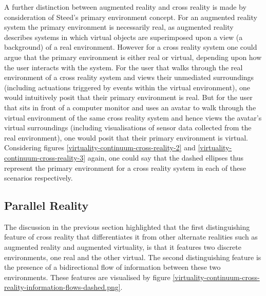 A further distinction between augmented reality and cross reality is made by consideration of Steed's primary environment concept. For an augmented reality system the primary environment is necessarily real, as augmented reality describes systems in which virtual objects are superimposed upon a view (a background) of a real environment. However for a cross reality system one could argue that the primary environment is either real or virtual, depending upon how the user interacts with the system. For the user that walks through the real environment of a cross reality system and views their unmediated surroundings (including actuations triggered by events within the virtual environment), one would intuitively posit that their primary environment is real. But for the user that sits in front of a computer monitor and uses an avatar to walk through the virtual environment of the same cross reality system and hence views the avatar's virtual surroundings (including visualisations of sensor data collected from the real environment), one would posit that their primary environment is virtual. Considering figures \ref{virtuality-continuum-cross-reality-2} and \ref{virtuality-continuum-cross-reality-3} again, one could say that the dashed ellipses thus represent the primary environment for a cross reality system in each of these scenarios respectively.


\subsection{Parallel Reality}

\newcommand{\PRfootnote}{\footnote{Note that the use of `PR' in the quotation in section \ref{subsec_HyperReality} is a reference to `physical reality' (that author's term for what this thesis simply calls `reality') and is not a reference to parallel reality.}}

The discussion in the previous section highlighted that the first distinguishing feature of cross reality that differentiates it from other alternate realities such as augmented reality and augmented virtuality, is that it features two discrete environments, one real and the other virtual. The second distinguishing feature is the presence of a bidirectional flow of information between these two environments. These features are visualised by figure \ref{virtuality-continuum-cross-reality-information-flows-dashed.png}.

